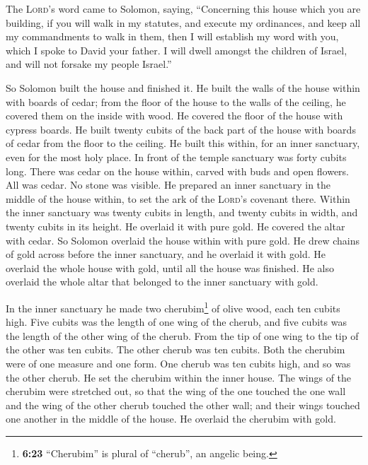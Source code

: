  The \textsc{Lord}'s word came to Solomon, saying,
 ``Concerning this house which you are building, if you
will walk in my statutes, and execute my ordinances, and keep all my
commandments to walk in them, then I will establish my word with you,
which I spoke to David your father.  I will dwell amongst
the children of Israel, and will not forsake my people Israel.''

 So Solomon built the house and finished it.
 He built the walls of the house within with boards of
cedar; from the floor of the house to the walls of the ceiling, he
covered them on the inside with wood. He covered the floor of the house
with cypress boards.  He built twenty cubits of the back
part of the house with boards of cedar from the floor to the ceiling. He
built this within, for an inner sanctuary, even for the most holy place.
 In front of the temple sanctuary was forty cubits long.
 There was cedar on the house within, carved with buds
and open flowers. All was cedar. No stone was visible. 
He prepared an inner sanctuary in the middle of the house within, to set
the ark of the \textsc{Lord}'s covenant there.  Within
the inner sanctuary was twenty cubits in length, and twenty cubits in
width, and twenty cubits in its height. He overlaid it with pure gold.
He covered the altar with cedar.  So Solomon overlaid the
house within with pure gold. He drew chains of gold across before the
inner sanctuary, and he overlaid it with gold.  He
overlaid the whole house with gold, until all the house was finished. He
also overlaid the whole altar that belonged to the inner sanctuary with
gold.

 In the inner sanctuary he made two cherubim\footnote{\textbf{6:23}
  ``Cherubim'' is plural of ``cherub'', an angelic being.} of olive
wood, each ten cubits high.  Five cubits was the length
of one wing of the cherub, and five cubits was the length of the other
wing of the cherub. From the tip of one wing to the tip of the other was
ten cubits.  The other cherub was ten cubits. Both the
cherubim were of one measure and one form.  One cherub
was ten cubits high, and so was the other cherub.  He set
the cherubim within the inner house. The wings of the cherubim were
stretched out, so that the wing of the one touched the one wall and the
wing of the other cherub touched the other wall; and their wings touched
one another in the middle of the house.  He overlaid the
cherubim with gold.

